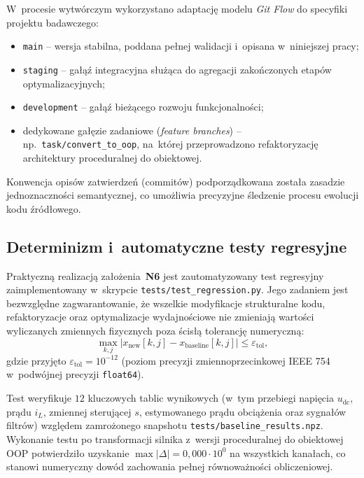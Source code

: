W~procesie wytwórczym wykorzystano adaptację modelu \emph{Git Flow} do specyfiki projektu badawczego:
\begin{itemize}
    \item \texttt{main} -- wersja stabilna, poddana pełnej walidacji i~opisana w~niniejszej pracy;
    \item \texttt{staging} -- gałąź integracyjna służąca do agregacji zakończonych etapów optymalizacyjnych;
    \item \texttt{development} -- gałąź bieżącego rozwoju funkcjonalności;
    \item dedykowane gałęzie zadaniowe (\emph{feature branches}) -- np.~\texttt{task/convert\_to\_oop}, na~której przeprowadzono refaktoryzację architektury proceduralnej do obiektowej.
\end{itemize}

Konwencja opisów zatwierdzeń (commitów) podporządkowana została zasadzie jednoznaczności semantycznej, co umożliwia precyzyjne śledzenie procesu ewolucji kodu źródłowego.

\subsection{Determinizm i~automatyczne testy regresyjne}
\label{subsec:reprodukowalnosc}

Praktyczną realizacją założenia~\textbf{N6} jest zautomatyzowany test regresyjny zaimplementowany w~skrypcie \texttt{tests/test\_regression.py}. Jego zadaniem jest bezwzględne zagwarantowanie, że wszelkie modyfikacje strukturalne kodu, refaktoryzacje oraz optymalizacje wydajnościowe nie zmieniają wartości wyliczanych zmiennych fizycznych poza ścisłą tolerancję numeryczną:
\begin{equation}
    \max_{k, j} \left| x_{\mathrm{new}}[k, j] - x_{\mathrm{baseline}}[k, j] \right| \le \varepsilon_{\mathrm{tol}},
    \label{eq:regression-tol}
\end{equation}
gdzie przyjęto $\varepsilon_{\mathrm{tol}} = 10^{-12}$ (poziom precyzji zmiennoprzecinkowej IEEE 754 w~podwójnej precyzji \texttt{float64}).

Test weryfikuje $12$ kluczowych tablic wynikowych (w~tym przebiegi napięcia $u_{\mathrm{dc}}$, prądu $i_L$, zmiennej sterującej $s$, estymowanego prądu obciążenia oraz sygnałów filtrów) względem zamrożonego snapshotu \texttt{tests/baseline\_results.npz}. Wykonanie testu po transformacji silnika z~wersji proceduralnej do obiektowej OOP potwierdziło uzyskanie $\max|\Delta| = 0{,}000\cdot 10^0$ na wszystkich kanałach, co stanowi numeryczny dowód zachowania pełnej równoważności obliczeniowej.


